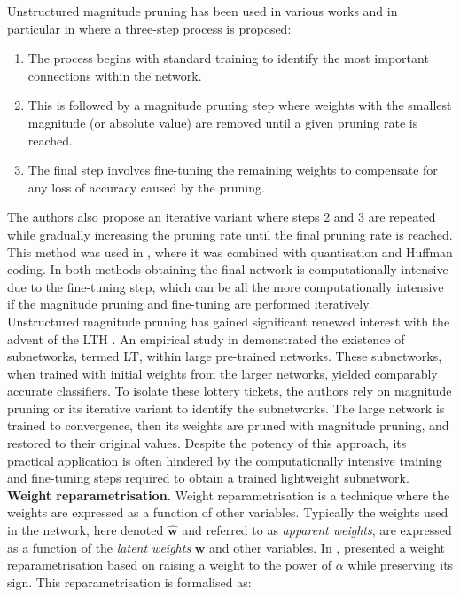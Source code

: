 Unstructured magnitude pruning has been used in various works and in particular
in \cite{DBLP:conf/nips/HanPTD15} where a three-step process is proposed:\\

\begin{enumerate}
  \item The process begins with standard training to identify the most important
  connections within the network.
  \item This is followed by a magnitude pruning step where weights with the
  smallest magnitude (or absolute value) are removed until a given pruning rate
  is reached.
  \item The final step involves fine-tuning the remaining weights to compensate
  for any loss of accuracy caused by the pruning.\\
\end{enumerate}

The authors also propose an iterative variant where steps 2 and 3 are
repeated while gradually increasing the pruning rate until the final pruning
rate is reached. This method was used in \cite{DBLP:journals/corr/HanMD15},
where it was combined with quantisation and Huffman coding. In both methods
\cite{DBLP:conf/nips/HanPTD15,DBLP:journals/corr/HanMD15} obtaining the final
network is computationally intensive due to the fine-tuning step, which can be
all the more computationally intensive if the magnitude pruning and fine-tuning
are performed iteratively. \\


Unstructured magnitude pruning has gained significant renewed interest with the
advent of the \acf{LTH} \cite{DBLP:conf/iclr/FrankleC19}. An empirical study in
\cite{DBLP:conf/iclr/FrankleC19} demonstrated the existence of subnetworks,
termed \acf{LT}, within large pre-trained networks. These subnetworks, when
trained with initial weights from the larger networks, yielded comparably
accurate classifiers. To isolate these lottery tickets, the authors rely on
magnitude pruning or its iterative variant to identify the subnetworks. The
large network is trained to convergence, then its weights are pruned with
magnitude pruning, and restored to their original values. Despite the potency of
this approach, its practical application is often hindered by the
computationally intensive training and fine-tuning steps required to obtain a
trained lightweight subnetwork.\\


\noindent \textbf{Weight reparametrisation.} Weight reparametrisation is a
technique where the weights are expressed as a function of other variables.
Typically the weights used in the network, here denoted $\mathbf{\hat{w}}$ and
referred to as \emph{apparent weights}, are expressed as a function of the
\emph{latent weights} $\mathbf{w}$ and other variables. In \cite{powerprop},
\citeauthor{powerprop} presented a weight reparametrisation based on raising a
weight to the power of $\alpha$ while preserving its sign. This
reparametrisation is formalised as: \\

